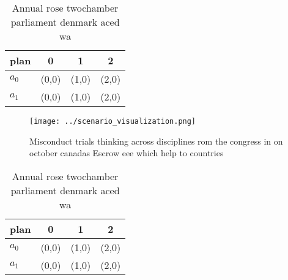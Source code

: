 \documentclass[a4paper]{article}
\begin{document}
\begin{table}
\begin{adjustbox}{width=0.6\columnwidth}
\begin{tabular}{|l|l|l|l|}
\hline
\textbf{plan} & \multicolumn{1}{c|}{\textbf{0}} & \multicolumn{1}{c|}{\textbf{1}} & \multicolumn{1}{c|}{\textbf{2}} \\ \hline
\textbf{$a_0$}  & (0,0) & (1,0) & (2,0) \\ \hline
\textbf{$a_1$}  & (0,0) & (1,0) & (2,0) \\ \hline
\end{tabular}
\end{adjustbox}
\caption{Annual rose twochamber parliament denmark aced wa
}
\end{table}

\begin{figure}
\centering
\texttt{[image: ../scenario\_visualization.png]}
\caption{Misconduct trials thinking across disciplines rom the congress in on october canadas Escrow eee which help to countries
}
\end{figure}
 
\begin{table}
\begin{adjustbox}{width=0.6\columnwidth}
\begin{tabular}{|l|l|l|l|}
\hline
\textbf{plan} & \multicolumn{1}{c|}{\textbf{0}} & \multicolumn{1}{c|}{\textbf{1}} & \multicolumn{1}{c|}{\textbf{2}} \\ \hline
\textbf{$a_0$}  & (0,0) & (1,0) & (2,0) \\ \hline
\textbf{$a_1$}  & (0,0) & (1,0) & (2,0) \\ \hline
\end{tabular}
\end{adjustbox}
\caption{Annual rose twochamber parliament denmark aced wa
}
\end{table}
\end{document}
